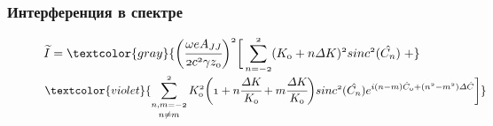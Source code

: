 \documentclass[14pt, hyperref = {colorlinks},xcolor=table ]{beamer}
\begin{document}
\small
\begin{frame}
\frametitle{Интерференция в спектре}\label{t1}
\vspace{-5pt}
\begin{figure}[h]
	\begin{minipage}[h]{0.49\linewidth}
		\vspace{-10pt}
	\end{minipage}	
	\begin{minipage}[h]{0.49\linewidth}
	\end{minipage}
\end{figure}
\vspace{-20pt}
\begin{figure}[h]
	$\mathnormal{{\widetilde{I}} =
	\textcolor{gray}{\bigg(\cfrac{\omega eA_{JJ}}{2c^2 \gamma z_0}\bigg)^2\bigg[
	\displaystyle\sum\limits_{n =-2}^{2}(K_0 + n\Delta K)^2sinc^2(\hat{C_n}) \; + }}$\\
	
	$\textcolor{violet}{\mathnormal{\displaystyle\mathop{\sum\limits_{n, m =-2}^{2}}_{n \neq m}K^2_0\bigg(1 + n\cfrac{\Delta K}{K_0} + m\cfrac{\Delta K}{K_0}\bigg)
	sinc^2(\hat{C_n})e^{i(n-m)\hat{C}_0 + (n^2 - m^2)\Delta \hat{C}}\bigg]}}$
\end{figure}
\end{frame}
\end{document}
